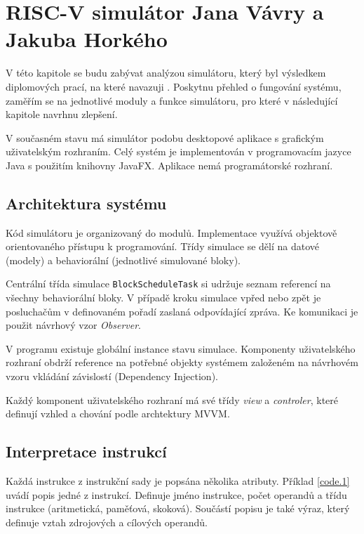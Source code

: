 
\chapter{RISC-V simulátor Jana Vávry a Jakuba Horkého}

V této kapitole se budu zabývat analýzou simulátoru, který byl výsledkem diplomových prací, na které navazuji \cite{horkySim, vavraSim}.
Poskytnu přehled o fungování systému, zaměřím se na jednotlivé moduly a funkce simulátoru, pro které v následující kapitole navrhnu zlepšení.

V současném stavu má simulátor podobu desktopové aplikace s grafickým uživatelským rozhraním.
Celý systém je implementován v programovacím jazyce Java s použitím knihovny JavaFX.
Aplikace nemá programátorské rozhraní.

\section{Architektura systému}

Kód simulátoru je organizovaný do modulů.
Implementace využívá objektově orientovaného přístupu k programování.
Třídy simulace se dělí na datové (modely) a behaviorální (jednotlivé simulované bloky).

Centrální třída simulace \texttt{BlockScheduleTask} si udržuje seznam referencí na všechny behaviorální bloky.
V případě kroku simulace vpřed nebo zpět je posluchačům v definovaném pořadí zaslaná odpovídající zpráva.
Ke komunikaci je použit návrhový vzor \emph{Observer}.

V programu existuje globální instance stavu simulace.
Komponenty uživatelského rozhraní obdrží reference na potřebné objekty systémem založeném na návrhovém vzoru vkládání závislostí (Dependency Injection).

Každý komponent uživatelského rozhraní má své třídy \emph{view} a \emph{controler}, které definují vzhled a chování podle archtektury MVVM.

\section{Interpretace instrukcí}
\label{interpret}

Každá instrukce z instrukční sady je popsána několika atributy.
Příklad \ref{code.1} uvádí popis jedné z instrukcí.
Definuje jméno instrukce, počet operandů a třídu instrukce (aritmetická, paměťová, skoková).
Součástí popisu je také výraz, který definuje vztah zdrojových a cílových operandů.

